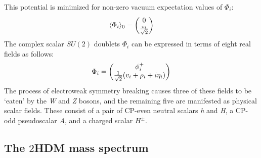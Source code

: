 This potential is minimized for non-zero vacuum expectation values of $\Phi_i$:
\begin{align}
\langle\Phi_i\rangle_0=\begin{pmatrix} 0 \\ \frac{v_i}{\sqrt{2}}\end{pmatrix}
\end{align}
The complex scalar $SU(2)$ doublets $\Phi_i$ can be expressed in terms of eight real fields as follows:
\begin{equation}\label{eq:2HDM_doublet_components}
\Phi_i = \begin{pmatrix} \phi_i^+ \\ \frac{1}{\sqrt{2}}(v_i+\rho_i+i\eta_i)\end{pmatrix}
\end{equation}
The process of electroweak symmetry breaking causes three of these fields to be `eaten' by the \emph{W} and \emph{Z} bosons, and the remaining five are manifested as physical scalar fields. These consist of a pair of CP-even neutral scalars \emph{h} and \emph{H}, a CP-odd pseudoscalar \emph{A}, and a charged scalar $H^\pm$.

\subsection{The $2$HDM mass spectrum}

